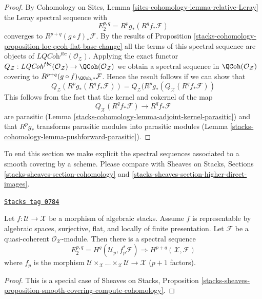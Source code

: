 \begin{proof}
By Cohomology on Sites, Lemma \ref{sites-cohomology-lemma-relative-Leray}
the Leray spectral sequence with
$$
E_2^{p, q} = R^pg_*(R^qf_*\mathcal{F})
$$
converges to $R^{p + q}(g \circ f)_*\mathcal{F}$. By the results of
Proposition \ref{stacks-cohomology-proposition-loc-qcoh-flat-base-change}
all the terms of this spectral sequence are objects of
$\textit{LQCoh}^{fbc}(\mathcal{O}_\mathcal{Z})$. Applying the exact functor
$Q_\mathcal{Z} : \textit{LQCoh}^{fbc}(\mathcal{O}_\mathcal{Z}) \to
\QCoh(\mathcal{O}_\mathcal{Z})$ we obtain a spectral sequence in
$\QCoh(\mathcal{O}_\mathcal{Z})$ covering to
$R^{p + q}(g \circ f)_{\QCoh, *}\mathcal{F}$. Hence
the result follows if we can show that
$$
Q_\mathcal{Z}(R^pg_*(R^qf_*\mathcal{F})) =
Q_\mathcal{Z}(R^pg_*(Q_\mathcal{X}(R^qf_*\mathcal{F}))
$$
This follows from the fact that the kernel and cokernel of the map
$$
Q_\mathcal{X}(R^qf_*\mathcal{F}) \longrightarrow R^qf_*\mathcal{F}
$$
are parasitic (Lemma \ref{stacks-cohomology-lemma-adjoint-kernel-parasitic}) and that
$R^pg_*$ transforms parasitic modules into parasitic modules
(Lemma \ref{stacks-cohomology-lemma-pushforward-parasitic}).
\end{proof}

To end this section we make explicit the spectral sequences
associated to a smooth covering by a scheme. Please compare with
Sheaves on Stacks, Sections \ref{stacks-sheaves-section-cohomology} and
\ref{stacks-sheaves-section-higher-direct-images}.

\begin{proposition}
\label{stacks-cohomology-proposition-smooth-covering-compute-cohomology}
\href{https://stacks.math.columbia.edu/tag/0784}{\texttt{Stacks tag 0784}}

Let $f : \mathcal{U} \to \mathcal{X}$ be a morphism of algebraic stacks.
Assume $f$ is representable by algebraic spaces, surjective, flat, and
locally of finite presentation. Let $\mathcal{F}$ be a quasi-coherent
$\mathcal{O}_\mathcal{X}$-module. Then there is a spectral sequence
$$
E_2^{p, q} = H^q(\mathcal{U}_p, f_p^*\mathcal{F})
\Rightarrow
H^{p + q}(\mathcal{X}, \mathcal{F})
$$
where $f_p$ is the morphism
$\mathcal{U} \times_\mathcal{X} \ldots \times_\mathcal{X} \mathcal{U} \to
\mathcal{X}$ ($p + 1$ factors).
\end{proposition}

\begin{proof}
This is a special case of
Sheaves on Stacks, Proposition
\ref{stacks-sheaves-proposition-smooth-covering-compute-cohomology}.
\end{proof}

